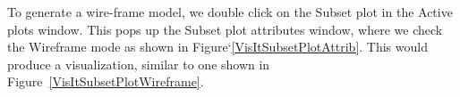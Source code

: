 

\begin{figure}[h]
  \centering
  \hspace{50pt}
 \vspace{-20pt}
  \caption{}
  \label{}
\end{figure}



To generate a wire-frame model, we double click on the Subset plot in
the Active plots window. This pops up the Subset plot attributes
window, where we check the Wireframe mode as shown in
Figure`\ref{VisItSubsetPlotAttrib}. This would produce a
visualization, similar to one shown in
Figure~\ref{VisItSubsetPlotWireframe}.




